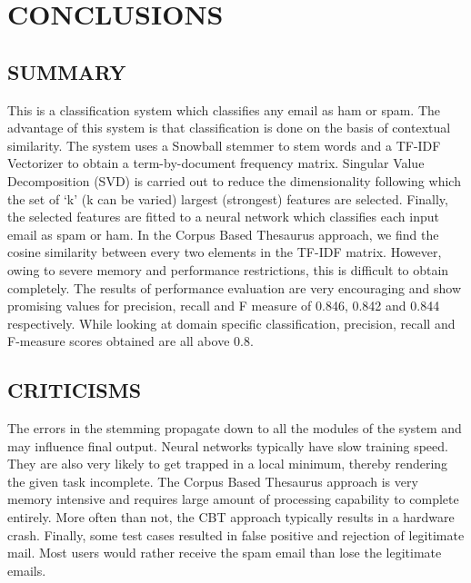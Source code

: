 
\chapter{CONCLUSIONS} %

\section{SUMMARY}
This is a classification system which classifies any email as ham or spam. The advantage of this system is that classification is done on the basis of contextual similarity. The system uses a Snowball stemmer to stem words and a TF-IDF Vectorizer to obtain a term-by-document frequency matrix. Singular Value Decomposition (SVD) is carried out to reduce the dimensionality following which the set of ‘k’ (k can be varied) largest (strongest) features are selected. Finally, the selected features are fitted to a neural network which classifies each input email as spam or ham. In the Corpus Based Thesaurus approach, we find the cosine similarity between every two elements in the TF-IDF matrix. However, owing to severe memory and performance restrictions, this is difficult to obtain completely. The results of performance evaluation are very encouraging and show promising values for precision, recall and F measure of 0.846, 0.842 and 0.844 respectively. While looking at domain specific classification, precision, recall and F-measure scores obtained are all above 0.8.

\section{CRITICISMS}
The errors in the stemming propagate down to all the modules of the system and may influence final output. Neural networks typically have slow training speed. They are also very likely to get trapped in a local minimum, thereby rendering the given task incomplete. The Corpus Based Thesaurus approach is very memory intensive and requires large amount of processing capability to complete entirely. More often than not, the CBT approach typically results in a hardware crash. Finally, some test cases resulted in false positive and rejection of legitimate mail. Most users would rather receive the spam email than lose the legitimate emails.

